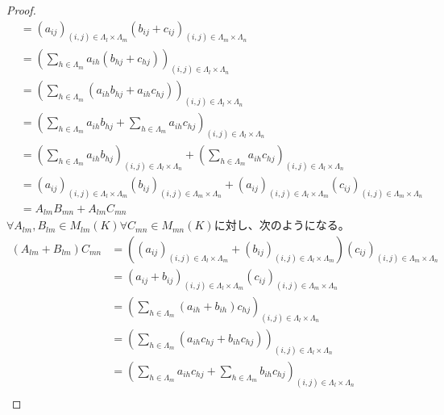 \documentclass[dvipdfmx]{jsarticle}
\begin{document}
\begin{proof}
\begin{align*}
&= \left( a_{ij} \right)_{(i,j) \in \varLambda_{l} \times \varLambda_{m}}\left( b_{ij} + c_{ij} \right)_{(i,j) \in \varLambda_{m} \times \varLambda_{n}}\\
&= \left( \sum_{h \in \varLambda_{m}} {a_{ih}\left( b_{hj} + c_{hj} \right)} \right)_{(i,j) \in \varLambda_{l} \times \varLambda_{n}}\\
&= \left( \sum_{h \in \varLambda_{m}} \left( a_{ih}b_{hj} + a_{ih}c_{hj} \right) \right)_{(i,j) \in \varLambda_{l} \times \varLambda_{n}}\\
&= \left( \sum_{h \in \varLambda_{m}} {a_{ih}b_{hj}} + \sum_{h \in \varLambda_{m}} {a_{ih}c_{hj}} \right)_{(i,j) \in \varLambda_{l} \times \varLambda_{n}}\\
&= \left( \sum_{h \in \varLambda_{m}} {a_{ih}b_{hj}} \right)_{(i,j) \in \varLambda_{l} \times \varLambda_{n}} + \left( \sum_{h \in \varLambda_{m}} {a_{ih}c_{hj}} \right)_{(i,j) \in \varLambda_{l} \times \varLambda_{n}}\\
&= \left( a_{ij} \right)_{(i,j) \in \varLambda_{l} \times \varLambda_{m}}\left( b_{ij} \right)_{(i,j) \in \varLambda_{m} \times \varLambda_{n}} + \left( a_{ij} \right)_{(i,j) \in \varLambda_{l} \times \varLambda_{m}}\left( c_{ij} \right)_{(i,j) \in \varLambda_{m} \times \varLambda_{n}}\\
&= A_{lm}B_{mn} + A_{lm}C_{mn}
\end{align*}
$\forall A_{lm},B_{lm} \in M_{lm}(K)\forall C_{mn} \in M_{mn}(K)$に対し、次のようになる。
\begin{align*}
\left( A_{lm} + B_{lm} \right)C_{mn} &= \left( \left( a_{ij} \right)_{(i,j) \in \varLambda_{l} \times \varLambda_{m}} + \left( b_{ij} \right)_{(i,j) \in \varLambda_{l} \times \varLambda_{m}} \right)\left( c_{ij} \right)_{(i,j) \in \varLambda_{m} \times \varLambda_{n}}\\
&= \left( a_{ij} + b_{ij} \right)_{(i,j) \in \varLambda_{l} \times \varLambda_{m}}\left( c_{ij} \right)_{(i,j) \in \varLambda_{m} \times \varLambda_{n}}\\
&= \left( \sum_{h \in \varLambda_{m}} {\left( a_{ih} + b_{ih} \right)c_{hj}} \right)_{(i,j) \in \varLambda_{l} \times \varLambda_{n}}\\
&= \left( \sum_{h \in \varLambda_{m}} \left( a_{ih}c_{hj} + b_{ih}c_{hj} \right) \right)_{(i,j) \in \varLambda_{l} \times \varLambda_{n}}\\
&= \left( \sum_{h \in \varLambda_{m}} {a_{ih}c_{hj}} + \sum_{h \in \varLambda_{m}} {b_{ih}c_{hj}} \right)_{(i,j) \in \varLambda_{l} \times \varLambda_{n}}\\

\end{align*}
\end{proof}
\end{document}

